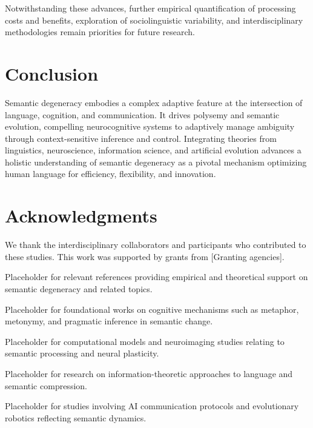 \documentclass[12pt,a4paper]{article}
\begin{document}
Notwithstanding these advances, further empirical quantification of processing costs and benefits, exploration of sociolinguistic variability, and interdisciplinary methodologies remain priorities for future research.

\section{Conclusion}

Semantic degeneracy embodies a complex adaptive feature at the intersection of language, cognition, and communication. It drives polysemy and semantic evolution, compelling neurocognitive systems to adaptively manage ambiguity through context-sensitive inference and control. Integrating theories from linguistics, neuroscience, information science, and artificial evolution advances a holistic understanding of semantic degeneracy as a pivotal mechanism optimizing human language for efficiency, flexibility, and innovation.

\section*{Acknowledgments}

We thank the interdisciplinary collaborators and participants who contributed to these studies. This work was supported by grants from [Granting agencies].

\begin{thebibliography}{99}

 Placeholder for relevant references providing empirical and theoretical support on semantic degeneracy and related topics.

 Placeholder for foundational works on cognitive mechanisms such as metaphor, metonymy, and pragmatic inference in semantic change.

 Placeholder for computational models and neuroimaging studies relating to semantic processing and neural plasticity.

 Placeholder for research on information-theoretic approaches to language and semantic compression.

 Placeholder for studies involving AI communication protocols and evolutionary robotics reflecting semantic dynamics.

\end{thebibliography}
\end{document}

